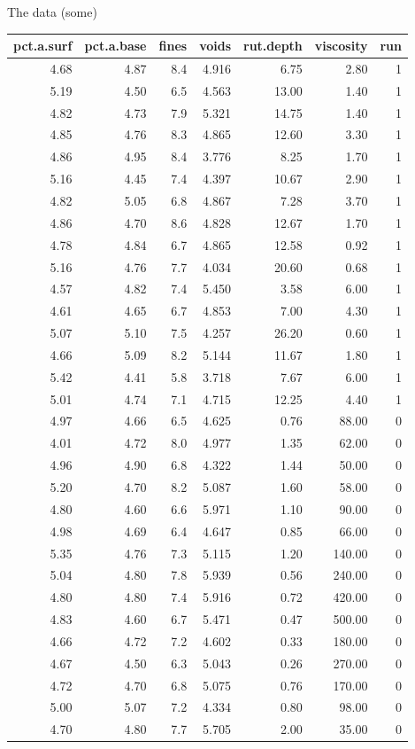 \begin{frame}[fragile]{The data (some)}
\protect\hypertarget{the-data-some}{}
\begin{Shaded}
\begin{Highlighting}[]
\end{Highlighting}
\end{Shaded}

\begin{longtable}[]{@{}rrrrrrr@{}}
\toprule
pct.a.surf & pct.a.base & fines & voids & rut.depth & viscosity &
run\tabularnewline
\midrule
\endhead
4.68 & 4.87 & 8.4 & 4.916 & 6.75 & 2.80 & 1\tabularnewline
5.19 & 4.50 & 6.5 & 4.563 & 13.00 & 1.40 & 1\tabularnewline
4.82 & 4.73 & 7.9 & 5.321 & 14.75 & 1.40 & 1\tabularnewline
4.85 & 4.76 & 8.3 & 4.865 & 12.60 & 3.30 & 1\tabularnewline
4.86 & 4.95 & 8.4 & 3.776 & 8.25 & 1.70 & 1\tabularnewline
5.16 & 4.45 & 7.4 & 4.397 & 10.67 & 2.90 & 1\tabularnewline
4.82 & 5.05 & 6.8 & 4.867 & 7.28 & 3.70 & 1\tabularnewline
4.86 & 4.70 & 8.6 & 4.828 & 12.67 & 1.70 & 1\tabularnewline
4.78 & 4.84 & 6.7 & 4.865 & 12.58 & 0.92 & 1\tabularnewline
5.16 & 4.76 & 7.7 & 4.034 & 20.60 & 0.68 & 1\tabularnewline
4.57 & 4.82 & 7.4 & 5.450 & 3.58 & 6.00 & 1\tabularnewline
4.61 & 4.65 & 6.7 & 4.853 & 7.00 & 4.30 & 1\tabularnewline
5.07 & 5.10 & 7.5 & 4.257 & 26.20 & 0.60 & 1\tabularnewline
4.66 & 5.09 & 8.2 & 5.144 & 11.67 & 1.80 & 1\tabularnewline
5.42 & 4.41 & 5.8 & 3.718 & 7.67 & 6.00 & 1\tabularnewline
5.01 & 4.74 & 7.1 & 4.715 & 12.25 & 4.40 & 1\tabularnewline
4.97 & 4.66 & 6.5 & 4.625 & 0.76 & 88.00 & 0\tabularnewline
4.01 & 4.72 & 8.0 & 4.977 & 1.35 & 62.00 & 0\tabularnewline
4.96 & 4.90 & 6.8 & 4.322 & 1.44 & 50.00 & 0\tabularnewline
5.20 & 4.70 & 8.2 & 5.087 & 1.60 & 58.00 & 0\tabularnewline
4.80 & 4.60 & 6.6 & 5.971 & 1.10 & 90.00 & 0\tabularnewline
4.98 & 4.69 & 6.4 & 4.647 & 0.85 & 66.00 & 0\tabularnewline
5.35 & 4.76 & 7.3 & 5.115 & 1.20 & 140.00 & 0\tabularnewline
5.04 & 4.80 & 7.8 & 5.939 & 0.56 & 240.00 & 0\tabularnewline
4.80 & 4.80 & 7.4 & 5.916 & 0.72 & 420.00 & 0\tabularnewline
4.83 & 4.60 & 6.7 & 5.471 & 0.47 & 500.00 & 0\tabularnewline
4.66 & 4.72 & 7.2 & 4.602 & 0.33 & 180.00 & 0\tabularnewline
4.67 & 4.50 & 6.3 & 5.043 & 0.26 & 270.00 & 0\tabularnewline
4.72 & 4.70 & 6.8 & 5.075 & 0.76 & 170.00 & 0\tabularnewline
5.00 & 5.07 & 7.2 & 4.334 & 0.80 & 98.00 & 0\tabularnewline
4.70 & 4.80 & 7.7 & 5.705 & 2.00 & 35.00 & 0\tabularnewline
\bottomrule
\end{longtable}
\end{frame}

